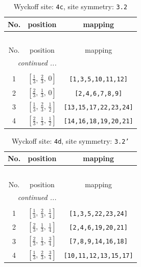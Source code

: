 \documentclass[fleqn,8pt]{jsarticle}
\begin{document}
\renewcommand{\arraystretch}{1.2}
\begin{longtable}{ccc}
\caption{Wyckoff site: {\tt 4c}, site symmetry: {\tt 3.2}}
 \\
 \hline \hline
No. & position & mapping \\ \hline \endfirsthead

\multicolumn{2}{l}{\tablename\ \thetable{}} \\
 \hline \hline
No. & position & mapping \\ \hline \endhead

 \hline \hline
\multicolumn{2}{r}{\footnotesize\it continued ...} \\ \endfoot

 \hline \hline
\multicolumn{2}{r}{} \\ \endlastfoot

1 & $\left[ \frac{1}{3},\, \frac{2}{3},\, 0 \right]$ & {\tt [1,3,5,10,11,12]} \\ \hline
2 & $\left[ \frac{2}{3},\, \frac{1}{3},\, 0 \right]$ & {\tt [2,4,6,7,8,9]} \\ \hline
3 & $\left[ \frac{1}{3},\, \frac{2}{3},\, \frac{1}{2} \right]$ & {\tt [13,15,17,22,23,24]} \\ \hline
4 & $\left[ \frac{2}{3},\, \frac{1}{3},\, \frac{1}{2} \right]$ & {\tt [14,16,18,19,20,21]} \\
\end{longtable}
\renewcommand{\arraystretch}{1.2}
\begin{longtable}{ccc}
\caption{Wyckoff site: {\tt 4d}, site symmetry: {\tt 3.2'}}
 \\
 \hline \hline
No. & position & mapping \\ \hline \endfirsthead

\multicolumn{2}{l}{\tablename\ \thetable{}} \\
 \hline \hline
No. & position & mapping \\ \hline \endhead

 \hline \hline
\multicolumn{2}{r}{\footnotesize\it continued ...} \\ \endfoot

 \hline \hline
\multicolumn{2}{r}{} \\ \endlastfoot

1 & $\left[ \frac{1}{3},\, \frac{2}{3},\, \frac{1}{4} \right]$ & {\tt [1,3,5,22,23,24]} \\ \hline
2 & $\left[ \frac{2}{3},\, \frac{1}{3},\, \frac{1}{4} \right]$ & {\tt [2,4,6,19,20,21]} \\ \hline
3 & $\left[ \frac{2}{3},\, \frac{1}{3},\, \frac{3}{4} \right]$ & {\tt [7,8,9,14,16,18]} \\ \hline
4 & $\left[ \frac{1}{3},\, \frac{2}{3},\, \frac{3}{4} \right]$ & {\tt [10,11,12,13,15,17]} \\
\end{longtable}
\end{document}
